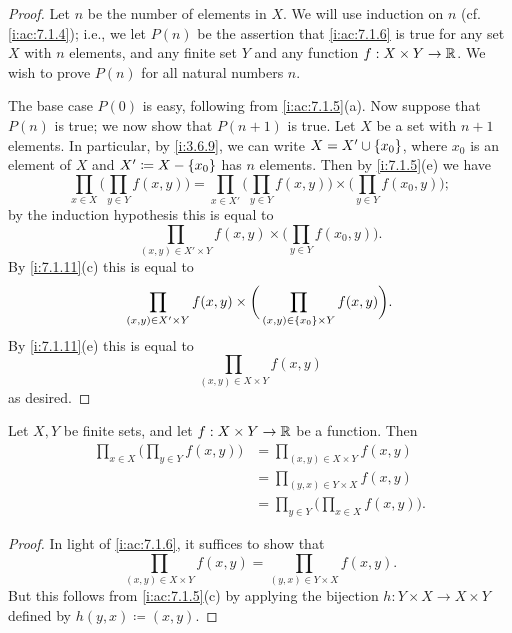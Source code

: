 \begin{proof}
  Let \(n\) be the number of elements in \(X\).
  We will use induction on \(n\) (cf. \cref{i:ac:7.1.4});
  i.e., we let \(P(n)\) be the assertion that \cref{i:ac:7.1.6} is true for any set \(X\) with \(n\) elements, and any finite set \(Y\) and any function \(f : X \times Y \to \mathbb{R}\).
  We wish to prove \(P(n)\) for all natural numbers \(n\).

  The base case \(P(0)\) is easy, following from \cref{i:ac:7.1.5}(a).
  Now suppose that \(P(n)\) is true;
  we now show that \(P(n + 1)\) is true.
  Let \(X\) be a set with \(n + 1\) elements.
  In particular, by \cref{i:3.6.9}, we can write \(X = X' \cup \left\lbrace x_0\right\rbrace\), where \(x_0\) is an element of \(X\) and \(X' \coloneqq X - \left\lbrace x_0\right\rbrace\) has \(n\) elements.
  Then by \cref{i:7.1.5}(e) we have
  \[
    \prod_{x \in X} \bigg(\prod_{y \in Y} f(x, y)\bigg) = \prod_{x \in X'} \bigg(\prod_{y \in Y} f(x, y)\bigg) \times \bigg(\prod_{y \in Y} f(x_0, y)\bigg);
  \]
  by the induction hypothesis this is equal to
  \[
    \prod_{(x, y) \in X' \times Y} f(x, y) \times \bigg(\prod_{y \in Y} f(x_0, y)\bigg).
  \]
  By \cref{i:7.1.11}(c) this is equal to
  \[
    \prod_{(x, y) \in X' \times Y} f(x, y) \times \bigg(\prod_{(x, y) \in \left\lbrace x_0\right\rbrace \times Y} f(x, y)\bigg).
  \]
  By \cref{i:7.1.11}(e) this is equal to
  \[
    \prod_{(x, y) \in X \times Y} f(x, y)
  \]
  as desired.
\end{proof}

\begin{ac}\label{i:ac:7.1.7}
  Let \(X, Y\) be finite sets, and let \(f : X \times Y \to \mathbb{R}\) be a function.
  Then
  \begin{align*}
    \prod_{x \in X} \bigg(\prod_{y \in Y} f(x, y)\bigg) & = \prod_{(x, y) \in X \times Y} f(x, y)                \\
                                                        & = \prod_{(y, x) \in Y \times X} f(x, y)                \\
                                                        & = \prod_{y \in Y} \bigg(\prod_{x \in X} f(x, y)\bigg).
  \end{align*}
\end{ac}

\begin{proof}
  In light of \cref{i:ac:7.1.6}, it suffices to show that
  \[
    \prod_{(x, y) \in X \times Y} f(x, y) = \prod_{(y, x) \in Y \times X} f(x, y).
  \]
  But this follows from \cref{i:ac:7.1.5}(c) by applying the bijection \(h : Y \times X \to X \times Y\) defined by \(h(y, x) \coloneqq (x, y)\).
\end{proof}

